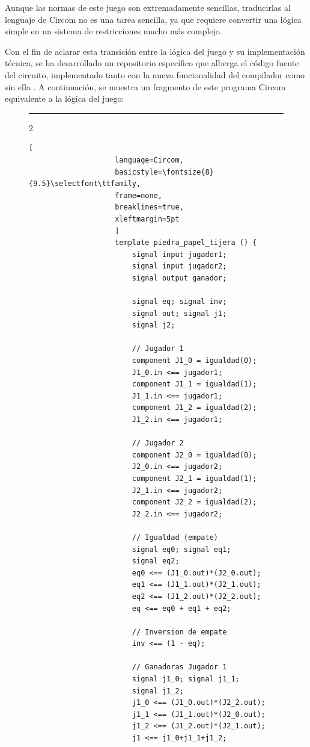 \documentclass[a4paper,12pt]{report}
\begin{document}
	\vspace{0.2cm}
	\noindent Aunque las normas de este juego son extremadamente sencillas, traducirlas al lenguaje de Circom no es una tarea sencilla, ya que requiere convertir una lógica simple en un sistema de restricciones mucho más complejo.
	
	\vspace{0.2cm}
	\noindent Con el fin de aclarar esta transición entre la lógica del juego y su implementación técnica, se ha desarrollado un repositorio específico que alberga el código fuente del circuito, implementado tanto con la nueva funcionalidad del compilador como sin ella \cite{rps_circom}. A continuación, se muestra un fragmento de este programa Circom equivalente a la lógica del juego:
	
	\vspace{0.3cm}
	\begin{figure}[H]
		\centering
		\hrule 
		\vspace{5pt} 
		
		\begin{minipage}{\textwidth}
			\begin{multicols}{2}
				\begin{lstlisting}[
					language=Circom,
					basicstyle=\fontsize{8}{9.5}\selectfont\ttfamily,
					frame=none, 
					breaklines=true,
					xleftmargin=5pt
					]
					template piedra_papel_tijera () {
						signal input jugador1; 
						signal input jugador2; 
						signal output ganador; 
						
						signal eq; signal inv;
						signal out; signal j1; 
						signal j2;
						
						// Jugador 1
						component J1_0 = igualdad(0);
						J1_0.in <== jugador1; 
						component J1_1 = igualdad(1);
						J1_1.in <== jugador1;
						component J1_2 = igualdad(2);
						J1_2.in <== jugador1;
						
						// Jugador 2
						component J2_0 = igualdad(0);
						J2_0.in <== jugador2;
						component J2_1 = igualdad(1);
						J2_1.in <== jugador2;
						component J2_2 = igualdad(2);
						J2_2.in <== jugador2;
						
						// Igualdad (empate)
						signal eq0; signal eq1; 
						signal eq2;
						eq0 <== (J1_0.out)*(J2_0.out);
						eq1 <== (J1_1.out)*(J2_1.out);
						eq2 <== (J1_2.out)*(J2_2.out);  
						eq <== eq0 + eq1 + eq2;       
						
						// Inversion de empate
						inv <== (1 - eq);
						
						// Ganadoras Jugador 1
						signal j1_0; signal j1_1; 
						signal j1_2;
						j1_0 <== (J1_0.out)*(J2_2.out);
						j1_1 <== (J1_1.out)*(J2_0.out);
						j1_2 <== (J1_2.out)*(J2_1.out);
						j1 <== j1_0+j1_1+j1_2;
						

\end{lstlisting}
\end{multicols}
\end{minipage}
\end{figure}
\end{document}
